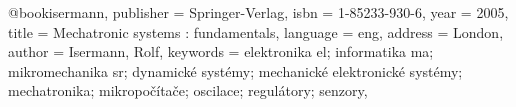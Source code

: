 @book{isermann, publisher = {Springer-Verlag}, isbn =
    {1-85233-930-6}, year = {2005}, title = {Mechatronic systems :
    fundamentals}, language = {eng}, address = {London}, author =
    {Isermann, Rolf}, keywords = {elektronika el; informatika ma;
    mikromechanika sr; dynamické systémy; mechanické elektronické
systémy; mechatronika; mikropočítače; oscilace; regulátory; senzory}, }
